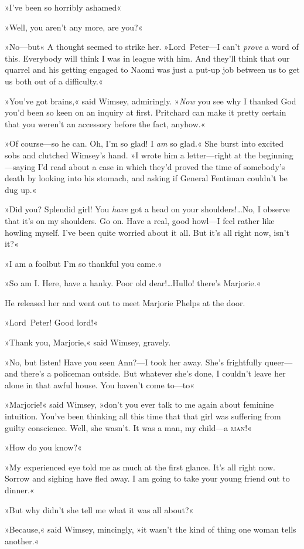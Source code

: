 »I've been so horribly ashamed\longdash«

»Well, you aren't any more, are you?«

»No—but\longdash« A thought seemed to strike her. »Lord~Peter—I can't \textit{prove} a word of this. Everybody will think I was in league with him. And they'll think that our quarrel and his getting engaged to Naomi was just a put-up job between us to get us both out of a difficulty.«

»You've got brains,« said Wimsey, admiringly. »\textit{Now} you see why I thanked God you'd been so keen on an inquiry at first. Pritchard can make it pretty certain that you weren't an accessory before the fact, anyhow.«

»Of course—so he can. Oh, I'm so glad! I \textit{am} so glad.« She burst into excited sobs and clutched Wimsey's hand. »I wrote him a letter—right at the beginning—saying I'd read about a case in which they'd proved the time of somebody's death by looking into his stomach, and asking if General Fentiman couldn't be dug up.«

»Did you? Splendid girl! You \textit{have} got a head on your shoulders!\dots No, I observe that it's on my shoulders. Go on. Have a real, good howl—I feel rather like howling myself. I've been quite worried about it all. But it's all right now, isn't it?«

»I am a fool\textellipsis  but I'm so thankful you came.«

»So am I\@. Here, have a hanky. Poor old dear!\dots Hullo! there's Marjorie.«

He released her and went out to meet Marjorie Phelps at the door.

»Lord~Peter! Good lord!«

»Thank you, Marjorie,« said Wimsey, gravely.

»No, but listen! Have you seen Ann?—I took her away. She's frightfully queer—and there's a policeman outside. But whatever she's done, I couldn't leave her alone in that awful house. You haven't come to—to\longdash«

»Marjorie!« said Wimsey, »don't you ever talk to me again about feminine intuition. You've been thinking all this time that that girl was suffering from guilty conscience. Well, she wasn't. It was a man, my child—a \textsc{man}!«

»How do you know?«

»My experienced eye told me as much at the first glance. It's all right now. Sorrow and sighing have fled away. I am going to take your young friend out to dinner.«

»But why didn't she tell me what it was all about?«

»Because,« said Wimsey, mincingly, »it wasn't the kind of thing one woman tells another.«
